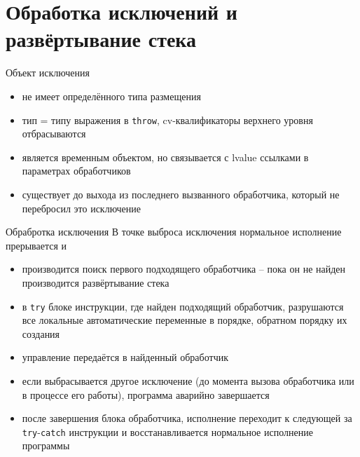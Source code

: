 \documentclass[unknownkeysallowed,xcolor=table]{beamer}
\begin{document}
\section{Обработка исключений и развёртывание стека}

\begin{frame}{Объект исключения}
  \begin{itemize}
    \item не имеет определённого типа размещения \vspace{1em}
    \item тип = типу выражения в \lstinline{throw}, cv-квалификаторы верхнего уровня отбрасываются \vspace{1em}
    \item является временным объектом, но связывается с lvalue ссылками в параметрах обработчиков \vspace{1em}
    \item существует до выхода из последнего вызванного обработчика, который не перебросил это исключение
  \end{itemize}
\end{frame}

\begin{frame}{Обрабротка исключения}
  В точке выброса исключения нормальное исполнение прерывается и
  \begin{itemize}
    \item производится поиск первого подходящего обработчика -- пока он не найден производится развёртывание стека
    \item в \lstinline{try} блоке инструкции, где найден подходящий обработчик, разрушаются все локальные автоматические переменные в порядке, обратном порядку их
      создания
    \item управление передаётся в найденный обработчик
    \item если выбрасывается другое исключение (до момента вызова обработчика или в процессе его работы), программа аварийно завершается
    \item после завершения блока обработчика, исполнение переходит к следующей за \lstinline{try}-\lstinline{catch} инструкции и восстанавливается нормальное
      исполнение программы
  \end{itemize}
\end{frame}
\end{document}
